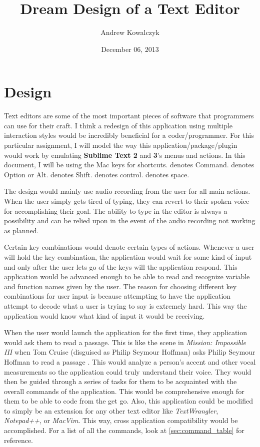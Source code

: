 \documentclass[11pt, oneside]{article}
\title{Dream Design of a Text Editor}
\author{Andrew Kowalczyk}
\date{December 06, 2013}
\begin{document}
\maketitle

\section{Design}

Text editors are some of the most important pieces of software that programmers can use for their craft. I think a redesign of this application using multiple interaction styles would be incredibly beneficial for a coder/programmer. For this particular assignment, I will model the way this application/package/plugin would work by emulating \textbf{Sublime Text 2} and \textbf{3}'s menus and actions. In this document, I will be using the Mac keys for shortcuts. \keys{\cmd} denotes Command. \keys{\Alt} denotes Option or Alt. \keys{\shift} denotes Shift. \keys{\ctrl} denotes control. \keys{\Space} denotes space.

The design would mainly use audio recording from the user for all main actions. When the user simply gets tired of typing, they can revert to their spoken voice for accomplishing their goal. The ability to type in the editor is always a possibility and can be relied upon in the event of the audio recording not working as planned.

Certain key combinations would denote certain types of actions. Whenever a user will hold the key combination, the application would wait for some kind of input and only after the user lets go of the keys will the application respond. This application would be advanced enough to be able to read and recognize variable and function names given by the user. The reason for choosing different key combinations for user input is because attempting to have the application attempt to decode what a user is trying to say is extremely hard. This way the application would know what kind of input it would be receiving.

When the user would launch the application for the first time, they application would ask them to read a passage. This is like the scene in \textit{Mission: Impossible III} when Tom Cruise (disguised as Philip Seymour Hoffman) asks Philip Seymour Hoffman to read a passage \cite{mission-impossible}. This would analyze a person's accent and other vocal measurements so the application could truly understand their voice. They would then be guided through a series of tasks for them to be acquainted with the overall commands of the application. This would be comprehensive enough for them to be able to code from the get go. Also, this application could be modified to simply be an extension for any other text editor like \textit{TextWrangler}, \textit{Notepad++}, or \textit{MacVim}. This way, cross application compatibility would be accomplished. 
	For a list of all the commands, look at \ref{sec:command_table} for reference. 
\end{document}
